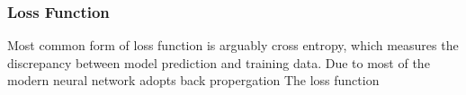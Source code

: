 \subsubsection{Loss Function}

Most common form of loss function is arguably cross entropy, which measures the discrepancy between model prediction and training data. Due to most of the modern neural network adopts back propergation The loss function 